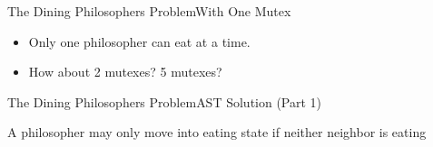 \begin{frame}{The Dining Philosophers Problem}{With One Mutex}
  \begin{minipage}{.49\linewidth}
    \begin{center}
    \end{center}
  \end{minipage} \hfill
  \begin{minipage}{.49\linewidth}
    \begin{center}
    \end{center}
  \end{minipage}
  \pause
  \begin{itemize}
  \item Only one philosopher can eat at a time.
  \item How about 2 mutexes? 5 mutexes?
  \end{itemize}
\end{frame}




\begin{frame}{The Dining Philosophers Problem}{AST Solution (Part 1)}
\begin{block}{A philosopher may only move into eating state if neither neighbor is
    eating}
  \begin{center}
  \end{center}
\end{block}
\end{frame}

